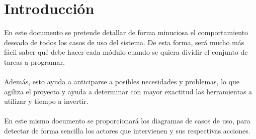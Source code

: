 \section{Introducción}\label{sec:intro}

En este documento se pretende detallar de forma minuciosa el comportamiento deseado de todos los casos de uso del sistema. De esta forma, será mucho más fácil saber qué debe hacer cada módulo cuando se quiera dividir el conjunto de tareas a programar.
\\
\\Además, esto ayuda a anticiparse a posibles necesidades y problemas, lo que agiliza el proyecto y ayuda a determinar con mayor exactitud las herramientas a utilizar y tiempo a invertir.
\\
\\En este mismo documento se proporcionará los diagramas de casos de uso, para detectar de forma sencilla los actores que intervienen y sus respectivas acciones.

